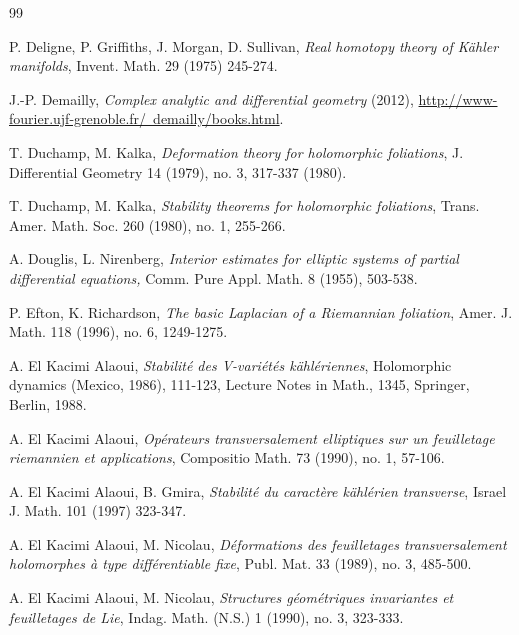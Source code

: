 \documentclass[12pt]{amsart}
\numberwithin{equation}{section}
\theoremstyle{definition}
\theoremstyle{definition}
\theoremstyle{definition}
\renewcommand{\1}{\mathsf{1}}
\renewcommand{\>}{\rightarrow}
\theoremstyle{plain} %
\theoremstyle{plain} %
\theoremstyle{plain} %
\begin{document}
\begin{thebibliography}{99}
		
		 P. Deligne, P. Griffiths, J. Morgan, D. Sullivan,
		\newblock \textit{Real homotopy theory of K\"ahler manifolds},
		\newblock Invent. Math. {29} (1975) 245-274.	
		
		 J.-P. Demailly,
		\newblock \textit{Complex analytic and differential geometry} (2012),
		\newblock
		\href{http://www-fourier.ujf-grenoble.fr/~demailly/books.html}{http://www-fourier.ujf-grenoble.fr/~demailly/books.html}.
		
		
		
		
		 T. Duchamp, M. Kalka,
		\newblock\textit{Deformation theory for holomorphic foliations},
		\newblock J. Differential Geometry 14 (1979), no. 3, 317-337 (1980).
		
		 T. Duchamp, M. Kalka,
		\newblock\textit{Stability theorems for holomorphic foliations},
		\newblock Trans. Amer. Math. Soc. 260 (1980), no. 1, 255-266.	
		
		 A. Douglis, L. Nirenberg,
		\newblock \textit{Interior estimates for elliptic
			systems of partial differential equations,}
		\newblock  Comm. Pure Appl. Math. 8 (1955), 503-538.
		
		 P. Efton, K. Richardson,
		\newblock\textit{The basic Laplacian of a Riemannian foliation},
		\newblock  Amer. J. Math. 118 (1996), no. 6, 1249-1275.
		
		 A. El Kacimi Alaoui,
		\newblock \textit{Stabilit\'e des V-vari\'et\'es k\"ahl\'eriennes},
		\newblock Holomorphic dynamics (Mexico, 1986), 111-123, Lecture Notes in Math., 1345, Springer, Berlin, 1988.
		
		 A. El Kacimi Alaoui,
		\newblock \textit{Op\'erateurs transversalement elliptiques sur un feuilletage riemannien et applications},
		\newblock Compositio Math. 73 (1990), no. 1, 57-106.
		
		A. El Kacimi Alaoui, B. Gmira,		\newblock \textit{Stabilit\'e du caract\`{e}re k\"ahl\'erien transverse},		\newblock	Israel J. Math. 101 (1997) 323-347.
		
		
		 A. El Kacimi Alaoui, M. Nicolau,
		\newblock\textit{ D\'eformations des feuilletages transversalement holomorphes \`{a} type diff\'erentiable fixe},
		\newblock Publ. Mat. 33 (1989), no. 3, 485-500.
		
		
		 A. El Kacimi Alaoui, M. Nicolau,
		\newblock \textit{Structures g\'eom\'etriques invariantes et feuilletages de Lie},
		\newblock 	Indag. Math. (N.S.) 1 (1990), no. 3, 323-333.
		

\end{thebibliography}
\end{document}
